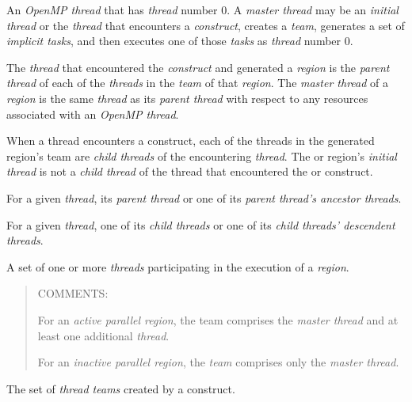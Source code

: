 \glossarydefstart
An \emph{OpenMP thread} that has  \emph{thread} number 0. A \emph{master
thread} may be an \emph{initial thread} or the \emph{thread} that encounters a
 \emph{construct}, creates a \emph{team}, generates a set of
\emph{implicit tasks}, and then executes one of those \emph{tasks} as
\emph{thread} number 0.
\glossarydefend

\glossarydefstart
The \emph{thread} that encountered the  \emph{construct} and generated a 
 \emph{region} is the \emph{parent thread} of each of the 
\emph{threads} in the \emph{team} of that 
 \emph{region}. The \emph{master thread} 
of a  \emph{region} is the same \emph{thread} 
as its \emph{parent thread} with respect to any resources associated with an \emph{OpenMP thread}.
\glossarydefend

\glossarydefstart
When a thread encounters a  construct, each of the threads in the 
generated  region's team are \emph{child threads} of the encountering \emph{thread}. 
The  or  region's \emph{initial thread} is not a \emph{child thread} of the thread 
that encountered the  or  construct. 
\glossarydefend

\glossarydefstart
For a given \emph{thread}, its \emph{parent thread} or one of its \emph{parent thread’s ancestor threads}.
\glossarydefend

\glossarydefstart
For a given \emph{thread}, one of its \emph{child threads} or one of 
its \emph{child threads’ descendent threads}.
\glossarydefend

\glossarydefstart
A set of one or more \emph{threads} participating in the execution of a 
\emph{region}.

\begin{quote}
COMMENTS:

For an \emph{active parallel region}, the team comprises the \emph{master thread} 
and at least one additional \emph{thread}.

For an \emph{inactive parallel region}, the \emph{team} comprises only the \emph{master thread}.
\end{quote}
\glossarydefend

\glossarydefstart
The set of \emph{thread teams} created by a  construct.
\glossarydefend

